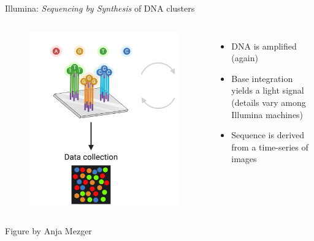 \documentclass[10pt]{beamer}
\newcommand{\creditdarkleft}[1]{{\vspace{\fill} \par \raggedright \scriptsize \mdseries \color{scMGray} #1 \par}}
\begin{document}
\begin{frame}[standout]{Illumina: \textit{Sequencing by Synthesis} of DNA clusters}
	\begin{columns}[T,onlytextwidth]
		\hspace*{-0.7cm} 
		\begin{figure}
			\includegraphics[width=\textwidth]{figures/ngs-cycles.png}
		\end{figure}
		\normalsize \normalfont
		\begin{itemize}
			\item DNA is amplified (again)
			\item Base integration yields a light signal (details vary among Illumina machines)
			\item Sequence is derived from a time-series of images
		\end{itemize}
	\end{columns}
	\creditdarkleft{Figure by Anja Mezger}
\end{frame}
\end{document}
